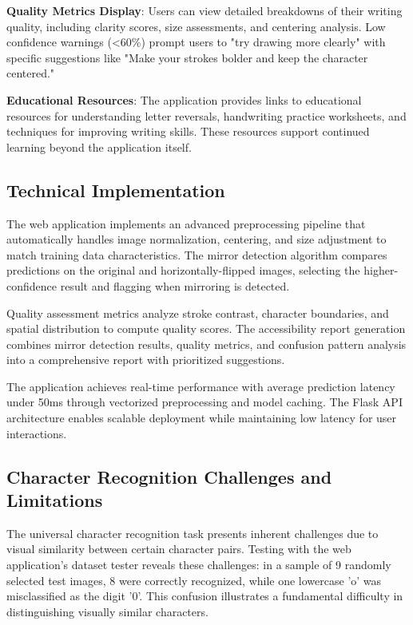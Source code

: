 \documentclass[11pt,a4paper]{report}
\begin{document}
\textbf{Quality Metrics Display}: Users can view detailed breakdowns of their writing quality, including clarity scores, size assessments, and centering analysis. Low confidence warnings (<60\%) prompt users to "try drawing more clearly" with specific suggestions like "Make your strokes bolder and keep the character centered."

\textbf{Educational Resources}: The application provides links to educational resources for understanding letter reversals, handwriting practice worksheets, and techniques for improving writing skills. These resources support continued learning beyond the application itself.

\subsection{Technical Implementation}

The web application implements an advanced preprocessing pipeline that automatically handles image normalization, centering, and size adjustment to match training data characteristics. The mirror detection algorithm compares predictions on the original and horizontally-flipped images, selecting the higher-confidence result and flagging when mirroring is detected.

Quality assessment metrics analyze stroke contrast, character boundaries, and spatial distribution to compute quality scores. The accessibility report generation combines mirror detection results, quality metrics, and confusion pattern analysis into a comprehensive report with prioritized suggestions.

The application achieves real-time performance with average prediction latency under 50ms through vectorized preprocessing and model caching. The Flask API architecture enables scalable deployment while maintaining low latency for user interactions.

\subsection{Character Recognition Challenges and Limitations}

The universal character recognition task presents inherent challenges due to visual similarity between certain character pairs. Testing with the web application's dataset tester reveals these challenges: in a sample of 9 randomly selected test images, 8 were correctly recognized, while one lowercase 'o' was misclassified as the digit '0'. This confusion illustrates a fundamental difficulty in distinguishing visually similar characters.
\end{document}
